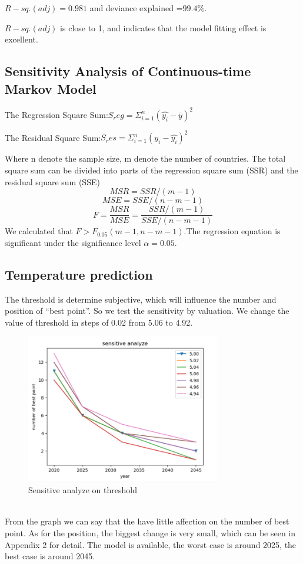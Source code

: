 \documentclass{mcmthesis}
\begin{document}
$R-sq.(adj) =  0.981$  and deviance explained =$ 99.4\%$.

$R-sq.(adj)$ is close to 1, and indicates that the model fitting effect is excellent.


\subsection{Sensitivity Analysis of Continuous-time Markov Model}

The Regression Square Sum:$S_reg=\Sigma^n_{i=1}(\hat{y_i}-\bar{y})^2$

The Residual Square Sum:$S_res=\Sigma^n_{i=1}(y_i-\hat{y_i})^2$

Where n denote the sample size, m denote the number of countries. The total square sum  can be divided into parts of the regression square sum
(SSR) and the residual square sum (SSE)
\begin{equation}
MSR=SSR/(m-1)
\end{equation}
\begin{equation}
MSE=SSE/(n-m-1)
\end{equation}
\begin{equation}
F=\frac{MSR}{MSE}=\frac{SSR/(m-1)}{SSE/(n-m-1)}
\end{equation}
 We calculated that $F > F_{0.05}(m-1,n-m-1)$.The regression equation is significant under the
significance level $\alpha=0.05$.
\subsection{Temperature prediction}
The threshold is determine subjective, which will influence the number and position of “best point”. So we test the sensitivity by valuation. We change the value of threshold in steps of 0.02 from 5.06 to 4.92.
\textbf{}
\begin{figure}[h]
\centering
\includegraphics[width=8.5cm]{./figures/sen.png}
\caption{ Sensitive analyze on threshold}
\end{figure}\\
From the graph we can say that the have little affection on the number of best point. As for the position, the biggest change is very small, which can be seen in Appendix 2 for detail. The model is available, the worst case is around 2025, the best case is around 2045.
\end{document}
